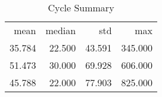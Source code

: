\begin{table}[ht]
\centering
\caption{Cycle Summary} 
\begin{tabular}{rrrr}
 mean & median & std & max \\ 
 35.784 & 22.500 & 43.591 & 345.000 \\ 
   \hline
51.473 & 30.000 & 69.928 & 606.000 \\ 
  45.788 & 22.000 & 77.903 & 825.000 \\ 
  \end{tabular}
\end{table}
